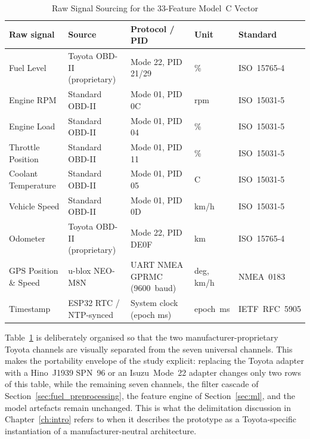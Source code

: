 \begin{table}[!htbp]
\centering
\caption{Raw Signal Sourcing for the 33-Feature Model~C Vector}
\label{tab:raw_signal_sourcing}
\scriptsize
\setlength{\tabcolsep}{3pt}
\renewcommand{\arraystretch}{1.15}
\begin{tabular}{|p{}|p{}|p{}|p{}|p{}|}
\hline
\textbf{Raw signal} & \textbf{Source} & \textbf{Protocol / PID} & \textbf{Unit} & \textbf{Standard} \\
\hline
Fuel Level & Toyota OBD-II (proprietary) & Mode 22, PID 21/29 & \% & ISO~15765-4~\cite{iso15765_4} \\
\hline
Engine RPM & Standard OBD-II & Mode 01, PID 0C & rpm & ISO~15031-5~\cite{iso15031_5} \\
\hline
Engine Load & Standard OBD-II & Mode 01, PID 04 & \% & ISO~15031-5~\cite{iso15031_5} \\
\hline
Throttle Position & Standard OBD-II & Mode 01, PID 11 & \% & ISO~15031-5~\cite{iso15031_5} \\
\hline
Coolant Temperature & Standard OBD-II & Mode 01, PID 05 & \textdegree{}C & ISO~15031-5~\cite{iso15031_5} \\
\hline
Vehicle Speed & Standard OBD-II & Mode 01, PID 0D & km/h & ISO~15031-5~\cite{iso15031_5} \\
\hline
Odometer & Toyota OBD-II (proprietary) & Mode 22, PID DE0F & km & ISO~15765-4~\cite{iso15765_4} \\
\hline
GPS Position \& Speed & u-blox NEO-M8N & UART NMEA GPRMC (9600~baud) & deg, km/h & NMEA~0183 \\
\hline
Timestamp & ESP32 RTC / NTP-synced & System clock (epoch ms) & epoch~ms & IETF~RFC~5905 \\
\hline
\end{tabular}
\normalsize
\end{table}

\noindent
Table~\ref{tab:raw_signal_sourcing} is deliberately organised so that the two manufacturer-proprietary Toyota channels are visually separated from the seven universal channels. This makes the portability envelope of the study explicit: replacing the Toyota adapter with a Hino~J1939 SPN~96 or an Isuzu~Mode~22 adapter changes only two rows of this table, while the remaining seven channels, the filter cascade of Section~\ref{sec:fuel_preprocessing}, the feature engine of Section~\ref{sec:ml}, and the model artefacts remain unchanged. This is what the delimitation discussion in Chapter~\ref{ch:intro} refers to when it describes the prototype as a Toyota-specific instantiation of a manufacturer-neutral architecture.

